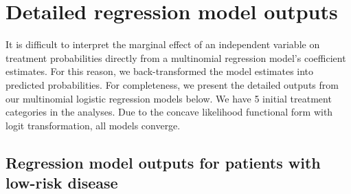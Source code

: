 \documentclass[12pt]{article}
\begin{document}
\section{Detailed regression model outputs}
It is difficult to interpret the marginal effect of an independent variable on treatment probabilities directly from a multinomial regression model's coefficient estimates. For this reason, we back-transformed the model estimates into predicted probabilities. For completeness, we present the detailed outputs from our multinomial logistic regression models below. We have 5 initial treatment categories in the analyses. Due to the concave likelihood functional form with logit transformation, all models converge. 

\pagebreak
\subsection{Regression model outputs for patients with low-risk disease}
\end{document}
